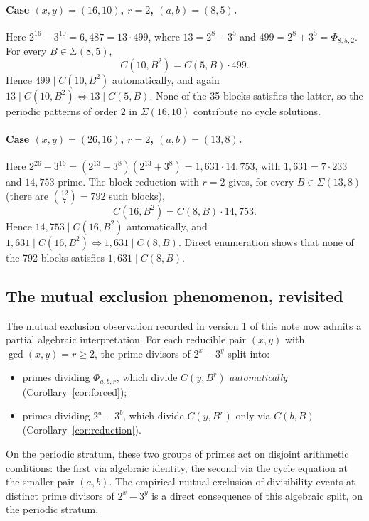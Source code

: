 \documentclass[11pt,a4paper]{article}
\theoremstyle{plain}
\theoremstyle{definition}
\begin{document}
\paragraph{Case $(x, y) = (16, 10)$, $r = 2$, $(a, b) = (8, 5)$.}
Here
$2^{16} - 3^{10} = 6{,}487 = 13 \cdot 499$,
where $13 = 2^8 - 3^5$ and $499 = 2^8 + 3^5 = \Phi_{8, 5, 2}$. For every
$B \in \Sigma(8, 5)$,
\[
C(10, B^2) = C(5, B) \cdot 499.
\]
Hence $499 \mid C(10, B^2)$ automatically, and again
$13 \mid C(10, B^2) \iff 13 \mid C(5, B)$. None of the 35 blocks satisfies the
latter, so the periodic patterns of order $2$ in $\Sigma(16, 10)$ contribute
no cycle solutions.

\paragraph{Case $(x, y) = (26, 16)$, $r = 2$, $(a, b) = (13, 8)$.}
Here
$2^{26} - 3^{16} = (2^{13} - 3^8)(2^{13} + 3^8) = 1{,}631 \cdot 14{,}753$,
with $1{,}631 = 7 \cdot 233$ and $14{,}753$ prime. The block reduction with
$r = 2$ gives, for every $B \in \Sigma(13, 8)$ (there are $\binom{12}{7} = 792$
such blocks),
\[
C(16, B^2) = C(8, B) \cdot 14{,}753.
\]
Hence $14{,}753 \mid C(16, B^2)$ automatically, and
$1{,}631 \mid C(16, B^2) \iff 1{,}631 \mid C(8, B)$. Direct enumeration shows
that none of the 792 blocks satisfies $1{,}631 \mid C(8, B)$.

\subsection{The mutual exclusion phenomenon, revisited}\label{sec:mutex}

The mutual exclusion observation recorded in version 1 of this note now
admits a partial algebraic interpretation. For each reducible pair $(x, y)$
with $\gcd(x, y) = r \ge 2$, the prime divisors of $2^x - 3^y$ split into:
\begin{itemize}
\item primes dividing $\Phi_{a, b, r}$, which divide $C(y, B^r)$
\emph{automatically} (Corollary~\ref{cor:forced});
\item primes dividing $2^a - 3^b$, which divide $C(y, B^r)$ only via
$C(b, B)$ (Corollary~\ref{cor:reduction}).
\end{itemize}
On the periodic stratum, these two groups of primes act on disjoint
arithmetic conditions: the first via algebraic identity, the second via
the cycle equation at the smaller pair $(a, b)$. The empirical mutual
exclusion of divisibility events at distinct prime divisors of $2^x - 3^y$
is a direct consequence of this algebraic split, on the periodic stratum.
\end{document}
